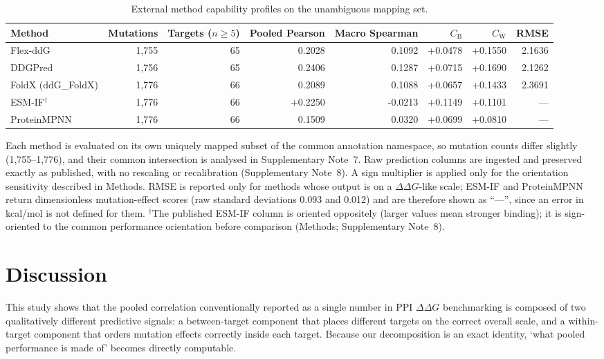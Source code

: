 \documentclass[11pt,a4paper]{article}
\begin{document}
\begin{table}[htbp]
  \centering
  \small
  \begin{threeparttable}
  \caption{External method capability profiles on the unambiguous mapping set.}
  \label{tab:external}
  \begin{tabular}{@{}lrrrrrrr@{}}
    \toprule
    Method & Mutations & Targets ($n \geq 5$) & Pooled Pearson & Macro Spearman
      & $C_{\mathrm{B}}$ & $C_{\mathrm{W}}$ & RMSE \\
    \midrule
Flex-ddG & 1,755 & 65 & 0.2028 & 0.1092 & +0.0478 & +0.1550 & 2.1636 \\
DDGPred & 1,756 & 65 & 0.2406 & 0.1287 & +0.0715 & +0.1690 & 2.1262 \\
FoldX (ddG\_FoldX) & 1,776 & 66 & 0.2089 & 0.1088 & +0.0657 & +0.1433 & 2.3691 \\
ESM-IF$^{\dagger}$ & 1,776 & 66 & +0.2250 & -0.0213 & +0.1149 & +0.1101 & --- \\
ProteinMPNN & 1,776 & 66 & 0.1509 & 0.0320 & +0.0699 & +0.0810 & --- \\
    \bottomrule
  \end{tabular}
  \begin{tablenotes}\footnotesize
    \item Each method is evaluated on its own uniquely mapped subset of the common annotation
      namespace, so mutation counts differ slightly (1{,}755--1{,}776), and their common
      intersection is analysed in Supplementary Note~7. Raw prediction columns are
      ingested and preserved exactly as published, with no rescaling or recalibration
      (Supplementary Note~8). A sign multiplier is applied only for the orientation
      sensitivity described in Methods. RMSE is reported only for methods whose output is
      on a $\Delta\Delta G$-like scale;
      ESM-IF and ProteinMPNN return dimensionless mutation-effect scores (raw standard
      deviations 0.093 and 0.012) and are therefore shown as ``---'', since an error in
      kcal/mol is not defined for them. $^{\dagger}$The published ESM-IF column is
      oriented oppositely (larger values mean stronger binding); it is sign-oriented to the
      common performance orientation before comparison (Methods; Supplementary Note~8).
  \end{tablenotes}
  \end{threeparttable}
\end{table}

\section{Discussion}
This study shows that the pooled correlation conventionally reported as a single number in
PPI $\Delta\Delta G$ benchmarking is composed of two qualitatively different predictive
signals: a between-target component that places different targets on the correct overall
scale, and a within-target component that orders mutation effects correctly inside each
target. Because our decomposition is an exact identity, `what pooled performance is made
of' becomes directly computable.
\end{document}
